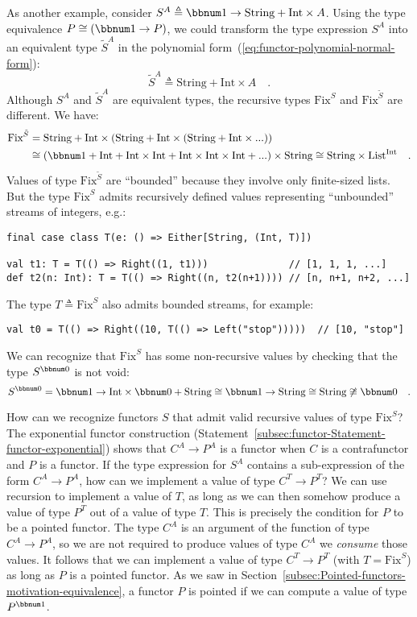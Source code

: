 As another example, consider $S^{A}\triangleq\bbnum 1\rightarrow\text{String}+\text{Int}\times A$.
Using the type equivalence $P\cong(\bbnum 1\rightarrow P)$, we could
transform the type expression $S^{A}$ into an equivalent type $\tilde{S}^{A}$
in the polynomial form~(\ref{eq:functor-polynomial-normal-form}):
\[
\tilde{S}^{A}\triangleq\text{String}+\text{Int}\times A\quad.
\]
Although $S^{A}$ and $\tilde{S}^{A}$ are equivalent types, the recursive
types $\text{Fix}^{S}$ and $\text{Fix}^{\tilde{S}}$ are different.
We have:
\begin{align*}
\text{Fix}^{\tilde{S}} & =\text{String}+\text{Int}\times(\text{String}+\text{Int}\times(\text{String}+\text{Int}\times...))\\
 & \cong\left(\bbnum 1+\text{Int}+\text{Int}\times\text{Int}+\text{Int}\times\text{Int}\times\text{Int}+...\right)\times\text{String}\cong\text{String}\times\text{List}^{\text{Int}}\quad.
\end{align*}
Values of type $\text{Fix}^{\tilde{S}}$ are \textsf{``}bounded\textsf{''} because
they involve only finite-sized lists. But the type $\text{Fix}^{S}$
admits recursively defined values representing \textsf{``}unbounded\textsf{''} streams
of integers, e.g.:
\begin{lstlisting}[mathescape=true]
final case class T(e: () => Either[String, (Int, T)])

val t1: T = T(() => Right((1, t1)))              // [1, 1, 1, ...]
def t2(n: Int): T = T(() => Right((n, t2(n+1)))) // [n, n+1, n+2, ...]
\end{lstlisting}
The type $T\triangleq\text{Fix}^{S}$ also admits bounded streams,
for example:
\begin{lstlisting}
val t0 = T(() => Right((10, T(() => Left("stop")))))  // [10, "stop"]
\end{lstlisting}
We can recognize that $\text{Fix}^{S}$ has some non-recursive values
by checking that the type $S^{\bbnum 0}$ is not void:
\[
S^{\bbnum 0}=\bbnum 1\rightarrow\text{Int}\times\bbnum 0+\text{String}\cong\bbnum 1\rightarrow\text{String}\cong\text{String}\not\cong\bbnum 0\quad.
\]

How can we recognize functors $S$ that admit valid recursive values
of type $\text{Fix}^{S}$? The exponential functor construction (Statement~\ref{subsec:functor-Statement-functor-exponential})
shows that $C^{A}\rightarrow P^{A}$ is a functor when $C$ is a contrafunctor
and $P$ is a functor. If the type expression for $S^{A}$ contains
a sub-expression of the form $C^{A}\rightarrow P^{A}$, how can we
implement a value of type $C^{T}\rightarrow P^{T}$? We can use recursion
to implement a value of $T$, as long as we can then somehow produce
a value of type $P^{T}$ out of a value of type $T$. This is precisely
the condition for $P$ to be a pointed functor. The type $C^{A}$
is an argument of the function of type $C^{A}\rightarrow P^{A}$,
so we are not required to produce values of type $C^{A}$\textemdash{}
we \emph{consume} those values. It follows that we can implement a
value of type $C^{T}\rightarrow P^{T}$ (with $T=\text{Fix}^{S}$)
as long as $P$ is a pointed functor. As we saw in Section~\ref{subsec:Pointed-functors-motivation-equivalence},
a functor $P$ is pointed if we can compute a value of type $P^{\bbnum 1}$.

